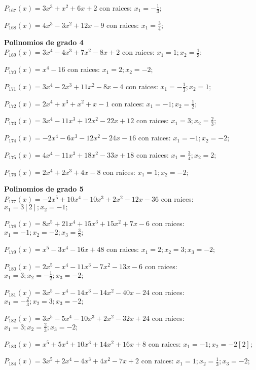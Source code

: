 \subitem $P_{167}(x) = 3x^3 + x^2 + 6x + 2$ con raices: $x_1 = -\frac{1}{3} ;  $

\subitem $P_{168}(x) = 4x^3 - 3x^2 + 12x - 9$ con raices: $x_1 = \frac{3}{4} ;  $

\textbf{Polinomios de grado 4\\} 
\subitem $P_{169}(x) = 3x^4 - 4x^3 + 7x^2 - 8x + 2$ con raices: $x_1 = 1 ; x_2 = \frac{1}{3} ;  $

\subitem $P_{170}(x) = x^4 - 16$ con raices: $x_1 = 2 ; x_2 = -2 ;  $

\subitem $P_{171}(x) = 3x^4 - 2x^3 + 11x^2 - 8x - 4$ con raices: $x_1 = -\frac{1}{3} ; x_2 = 1 ;  $

\subitem $P_{172}(x) = 2x^4 + x^3 + x^2 + x - 1$ con raices: $x_1 = -1 ; x_2 = \frac{1}{2} ;  $

\subitem $P_{173}(x) = 3x^4 - 11x^3 + 12x^2 - 22x + 12$ con raices: $x_1 = 3 ; x_2 = \frac{2}{3} ;  $

\subitem $P_{174}(x) = -2x^4 - 6x^3 - 12x^2 - 24x - 16$ con raices: $x_1 = -1 ; x_2 = -2 ;  $

\subitem $P_{175}(x) = 4x^4 - 11x^3 + 18x^2 - 33x + 18$ con raices: $x_1 = \frac{3}{4} ; x_2 = 2 ;  $

\subitem $P_{176}(x) = 2x^4 + 2x^3 + 4x - 8$ con raices: $x_1 = 1 ; x_2 = -2 ;  $

\textbf{Polinomios de grado 5\\} 
\subitem $P_{177}(x) = -2x^5 + 10x^4 - 10x^3 + 2x^2 - 12x - 36$ con raices: $x_1 = 3[2] ; x_2 = -1 ;  $

\subitem $P_{178}(x) = 8x^5 + 21x^4 + 15x^3 + 15x^2 + 7x - 6$ con raices: $x_1 = -1 ; x_2 = -2 ; x_3 = \frac{3}{8} ;  $

\subitem $P_{179}(x) = x^5 - 3x^4 - 16x + 48$ con raices: $x_1 = 2 ; x_2 = 3 ; x_3 = -2 ;  $

\subitem $P_{180}(x) = 2x^5 - x^4 - 11x^3 - 7x^2 - 13x - 6$ con raices: $x_1 = 3 ; x_2 = -\frac{1}{2} ; x_3 = -2 ;  $

\subitem $P_{181}(x) = 3x^5 - x^4 - 14x^3 - 14x^2 - 40x - 24$ con raices: $x_1 = -\frac{2}{3} ; x_2 = 3 ; x_3 = -2 ;  $

\subitem $P_{182}(x) = 3x^5 - 5x^4 - 10x^3 + 2x^2 - 32x + 24$ con raices: $x_1 = 3 ; x_2 = \frac{2}{3} ; x_3 = -2 ;  $

\subitem $P_{183}(x) = x^5 + 5x^4 + 10x^3 + 14x^2 + 16x + 8$ con raices: $x_1 = -1 ; x_2 = -2[2] ;  $

\subitem $P_{184}(x) = 3x^5 + 2x^4 - 4x^3 + 4x^2 - 7x + 2$ con raices: $x_1 = 1 ; x_2 = \frac{1}{3} ; x_3 = -2 ;  $

